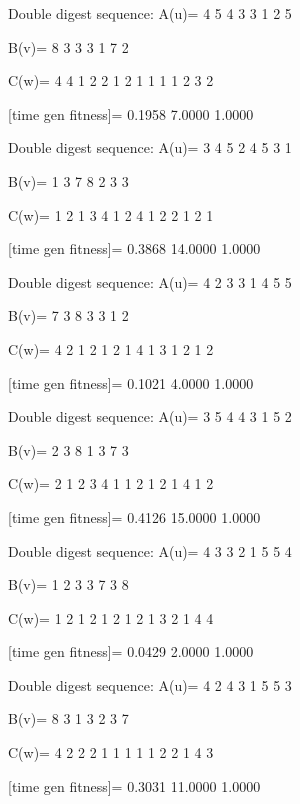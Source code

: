 Double digest sequence:
A(u)=
     4     5     4     3     3     1     2     5

B(v)=
     8     3     3     3     1     7     2

C(w)=
     4     4     1     2     2     1     2     1     1     1     1     2     3     2

[time gen fitness]=
    0.1958    7.0000    1.0000

Double digest sequence:
A(u)=
     3     4     5     2     4     5     3     1

B(v)=
     1     3     7     8     2     3     3

C(w)=
     1     2     1     3     4     1     2     4     1     2     2     1     2     1

[time gen fitness]=
    0.3868   14.0000    1.0000

Double digest sequence:
A(u)=
     4     2     3     3     1     4     5     5

B(v)=
     7     3     8     3     3     1     2

C(w)=
     4     2     1     2     1     2     1     4     1     3     1     2     1     2

[time gen fitness]=
    0.1021    4.0000    1.0000

Double digest sequence:
A(u)=
     3     5     4     4     3     1     5     2

B(v)=
     2     3     8     1     3     7     3

C(w)=
     2     1     2     3     4     1     1     2     1     2     1     4     1     2

[time gen fitness]=
    0.4126   15.0000    1.0000

Double digest sequence:
A(u)=
     4     3     3     2     1     5     5     4

B(v)=
     1     2     3     3     7     3     8

C(w)=
     1     2     1     2     1     2     1     2     1     3     2     1     4     4

[time gen fitness]=
    0.0429    2.0000    1.0000

Double digest sequence:
A(u)=
     4     2     4     3     1     5     5     3

B(v)=
     8     3     1     3     2     3     7

C(w)=
     4     2     2     2     1     1     1     1     1     2     2     1     4     3

[time gen fitness]=
    0.3031   11.0000    1.0000

